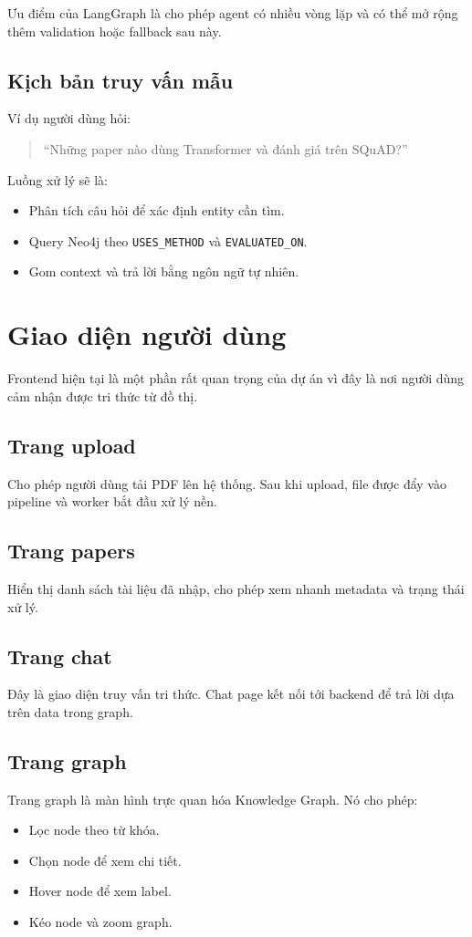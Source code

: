 \documentclass[12pt,a4paper]{article}
\begin{document}
Ưu điểm của LangGraph là cho phép agent có nhiều vòng lặp và có thể mở rộng thêm validation hoặc fallback sau này.

\subsection{Kịch bản truy vấn mẫu}
Ví dụ người dùng hỏi:
\begin{quote}
  ``Những paper nào dùng Transformer và đánh giá trên SQuAD?''
\end{quote}

Luồng xử lý sẽ là:
\begin{itemize}[leftmargin=1.6em]
  \item Phân tích câu hỏi để xác định entity cần tìm.
  \item Query Neo4j theo \texttt{USES\_METHOD} và \texttt{EVALUATED\_ON}.
  \item Gom context và trả lời bằng ngôn ngữ tự nhiên.
\end{itemize}

\section{Giao diện người dùng}
Frontend hiện tại là một phần rất quan trọng của dự án vì đây là nơi người dùng cảm nhận được tri thức từ đồ thị.

\subsection{Trang upload}
Cho phép người dùng tải PDF lên hệ thống. Sau khi upload, file được đẩy vào pipeline và worker bắt đầu xử lý nền.

\subsection{Trang papers}
Hiển thị danh sách tài liệu đã nhập, cho phép xem nhanh metadata và trạng thái xử lý.

\subsection{Trang chat}
Đây là giao diện truy vấn tri thức. Chat page kết nối tới backend để trả lời dựa trên data trong graph.

\subsection{Trang graph}
Trang graph là màn hình trực quan hóa Knowledge Graph. Nó cho phép:
\begin{itemize}[leftmargin=1.6em]
  \item Lọc node theo từ khóa.
  \item Chọn node để xem chi tiết.
  \item Hover node để xem label.
  \item Kéo node và zoom graph.
\end{itemize}
\end{document}
